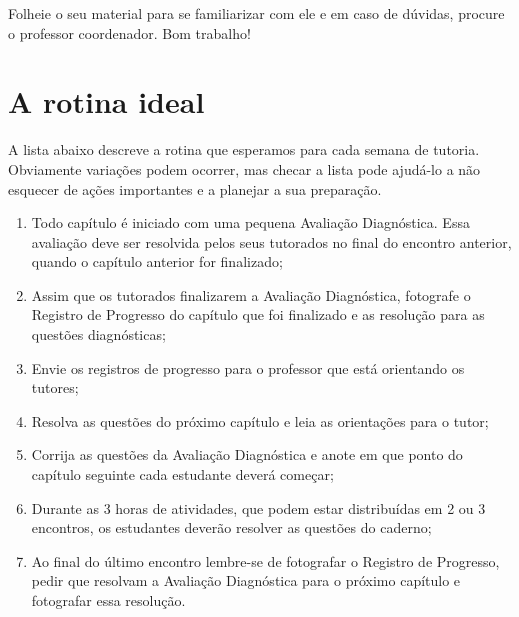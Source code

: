 \documentclass[openany]{book}
\begin{document}
Folheie o seu material para se familiarizar com ele e em caso de dúvidas, procure o professor coordenador. Bom trabalho!

\section{A rotina ideal}

A lista abaixo descreve a rotina que esperamos para cada semana de tutoria. Obviamente variações podem ocorrer, mas checar a lista pode ajudá-lo a não esquecer de ações importantes e a planejar a sua preparação.

\begin{enumerate}
 \item Todo capítulo é iniciado com uma pequena Avaliação Diagnóstica. Essa avaliação deve ser resolvida pelos seus tutorados no final do encontro anterior, quando o capítulo anterior for finalizado;
 \item Assim que os tutorados finalizarem a Avaliação Diagnóstica, fotografe o Registro de Progresso do capítulo que foi finalizado e as resolução para as questões diagnósticas;
 \item Envie os registros de progresso para o professor que está orientando os tutores;
 \item Resolva as questões do próximo capítulo e leia as orientações para o tutor;
 \item Corrija as questões da Avaliação Diagnóstica e anote em que ponto do capítulo seguinte cada estudante deverá começar;
 \item Durante as 3 horas de atividades, que podem estar distribuídas em 2 ou 3 encontros, os estudantes deverão resolver as questões do caderno;
 \item Ao final do último encontro lembre-se de fotografar o Registro de Progresso, pedir que resolvam a Avaliação Diagnóstica para o próximo capítulo e fotografar essa resolução.
\end{enumerate}









 



 
\end{document}
